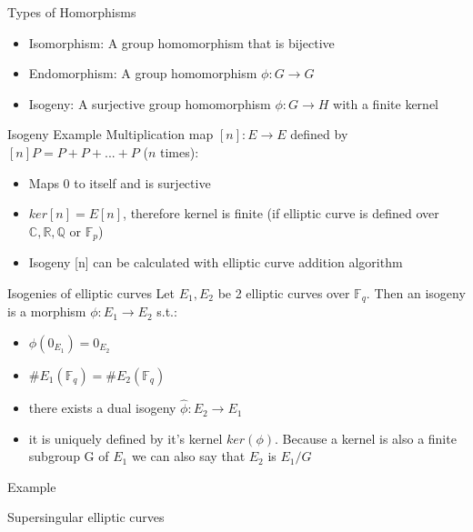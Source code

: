 \documentclass{beamer}
\begin{document}
\begin{frame}{Types of Homorphisms}
	\begin{itemize}
		\item Isomorphism: A group homomorphism that is bijective %
		\item Endomorphism: A group homomorphism $\phi: G \to G$
		\item Isogeny: A surjective group homomorphism $\phi : G \to H$ with a finite kernel
	\end{itemize}

\begin{block}{Isogeny Example}
	Multiplication map $[n]: E \to E$ defined by $[n]P = P + P + ...+ P$ ($n$ times):
	\begin{itemize}
		\item Maps 0 to itself and is surjective
		\item $ker[n] = E[n]$, therefore kernel is finite (if elliptic curve is defined over $\mathbb{C},\mathbb{R},\mathbb{Q}$ or $\mathbb{F}_p$)
		\item Isogeny [n] can be calculated with elliptic curve addition algorithm %
		
	\end{itemize}
\end{block}

\end{frame}

\begin{frame}{Isogenies of elliptic curves}
Let $E_1,E_2$ be 2 elliptic curves over $\mathbb{F}_q$. Then an isogeny is a morphism $\phi: E_1 \to E_2$ s.t.:
\begin{itemize}
	\item $\phi(0_{E_1})= 0_{E_2}$
	\item $\#E_1(\mathbb{F}_q) = \#E_2(\mathbb{F}_q)$
	\item there exists a dual isogeny $\hat{\phi}: E_2 \to E_1$
	\item it is uniquely defined by it's kernel $ker(\phi)$. Because a kernel is also a finite subgroup G of $E_1$ we can also say that $E_2$ is $E_1/G$
\end{itemize}
\begin{block}{Example}
\end{block}

\end{frame}
\begin{frame}{Supersingular elliptic curves}

\end{frame}
\end{document}
